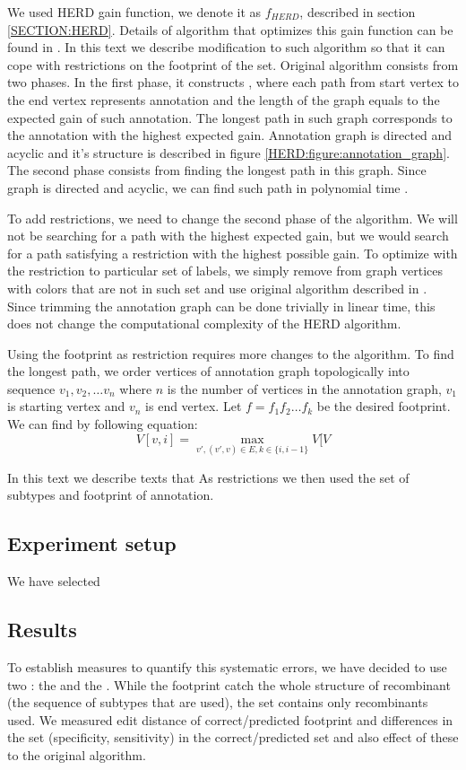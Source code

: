 We used HERD gain function, we denote it as $f_{HERD}$, described in section
\ref{SECTION:HERD}. Details of algorithm that optimizes this gain function can
be found in \cite{Nanasi2010, Nanasi2010mgr}. In this text we describe
modification to such algorithm so that it can cope with restrictions on the
footprint of the set. Original algorithm consists from two phases. In the first
phase, it
constructs , where each path from start vertex to the
end vertex represents annotation and the length of the graph equals to the
expected gain of such annotation. The longest path in such graph corresponds to
the annotation with the highest expected gain. Annotation graph is directed and
acyclic and it's structure is described in figure
\ref{HERD:figure:annotation_graph}.  The second phase consists from finding the
longest path in this graph. Since graph is directed and acyclic, we can find
such path in polynomial time \cite{Nanasi2010mgr}.

To add restrictions, we need to change the second phase of the algorithm. We
will not be searching for a path with the highest expected gain, but we would
search for a path satisfying a restriction with the highest possible gain. To
optimize with the restriction to particular set of labels,  we simply remove
from graph vertices with colors that are not in such set and use original
algorithm described in \cite{Nanasi2010mgr}. Since trimming the annotation graph
can be done trivially in linear time, this does not change the computational
complexity of the HERD algorithm. 

Using the footprint as restriction requires more changes to the algorithm. To
find the longest path, we order vertices of annotation graph topologically into
sequence $v_1, v_2, \dots v_n$ where $n$ is the number of vertices in the
annotation graph, $v_1$ is starting vertex and $v_n$ is end vertex. Let
$f=f_1f_2\dots f_k$ be the desired footprint. We can find by following equation:
\begin{equation}
V[v, i] = \max_{v', (v',v) \in E, k\in \{i, i-1\}} V[V
\end{equation}

In this text we describe texts
that As restrictions we then used the set of
subtypes and footprint of annotation. 

\subsection{Experiment setup}
We have selected 
\subsection{Results}
To establish measures to quantify this systematic errors, we have decided to use
two : the  and the
. While the footprint catch the whole structure of
recombinant (the sequence of subtypes that are used), the set contains only
recombinants used. We measured edit distance of correct/predicted footprint
and differences in the set (specificity, sensitivity) in the correct/predicted
set and also effect of these to the original algorithm.

